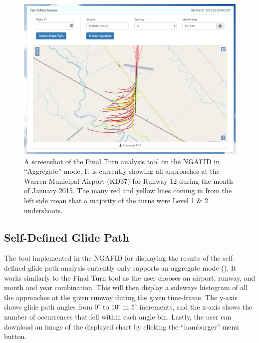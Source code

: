        \begin{figure}
    		\centering
            \includegraphics[width=\linewidth]{img/agg_ttf_screenshot}
            \caption{A screenshot of the Final Turn analysis tool on the NGAFID in ``Aggregate'' mode.  It is currently showing all approaches at the Warren Municipal Airport (KD37) for Runway 12 during the month of January 2015.  The many red and yellow lines coming in from the left side mean that a majority of the turns were Level 1 \& 2 undershoots.}
            \label{fig:agg_ttf_screenshot}
    	\end{figure}
    
    \subsection{Self-Defined Glide Path}
    
    	The tool implemented in the NGAFID for displaying the results of the self-defined glide path analysis currently only supports an aggregate mode ().  It works similarly to the Final Turn tool as the user chooses an airport, runway, and month and year combination.  This will then display a sideways histogram of all the approaches at the given runway during the given time-frame.  The y-axis shows glide path angles from $0^\circ$ to $10^\circ$ in $5^\circ$ increments, and the x-axis shows the number of occurrences that fell within each angle bin.  Lastly, the user can download an image of the displayed chart by clicking the ``hamburger'' menu button.
    
